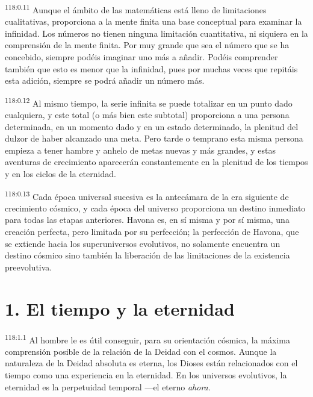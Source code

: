 \par
\textsuperscript{118:0.11} Aunque el ámbito de las matemáticas está lleno de limitaciones cualitativas, proporciona a la mente finita una base conceptual para examinar la infinidad. Los números no tienen ninguna limitación cuantitativa, ni siquiera en la comprensión de la mente finita. Por muy grande que sea el número que se ha concebido, siempre podéis imaginar uno más a añadir. Podéis comprender también que esto es menor que la infinidad, pues por muchas veces que repitáis esta adición, siempre se podrá añadir un número más.

\par
\textsuperscript{118:0.12} Al mismo tiempo, la serie infinita se puede totalizar en un punto dado cualquiera, y este total (o más bien este subtotal) proporciona a una persona determinada, en un momento dado y en un estado determinado, la plenitud del dulzor de haber alcanzado una meta. Pero tarde o temprano esta misma persona empieza a tener hambre y anhelo de metas nuevas y más grandes, y estas aventuras de crecimiento aparecerán constantemente en la plenitud de los tiempos y en los ciclos de la eternidad.

\par
\textsuperscript{118:0.13} Cada época universal sucesiva es la antecámara de la era siguiente de crecimiento cósmico, y cada época del universo proporciona un destino inmediato para todas las etapas anteriores. Havona es, en sí misma y por sí misma, una creación perfecta, pero limitada por su perfección; la perfección de Havona, que se extiende hacia los superuniversos evolutivos, no solamente encuentra un destino cósmico sino también la liberación de las limitaciones de la existencia preevolutiva.

\section*{1. El tiempo y la eternidad}
\par
\textsuperscript{118:1.1} Al hombre le es útil conseguir, para su orientación cósmica, la máxima comprensión posible de la relación de la Deidad con el cosmos. Aunque la naturaleza de la Deidad absoluta es eterna, los Dioses están relacionados con el tiempo como una experiencia en la eternidad. En los universos evolutivos, la eternidad es la perpetuidad temporal ---el eterno \textit{ahora}.

